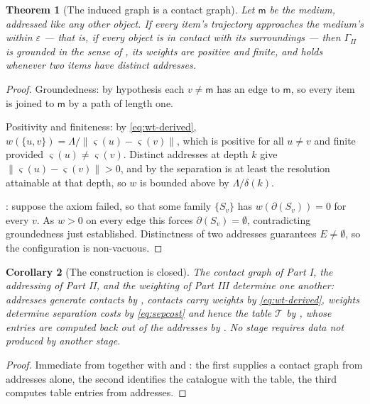 \documentclass[11pt,twocolumn,a4paper]{article}
\theoremstyle{thmstyle}
\newtheorem{theorem}{Theorem}[section]
\newtheorem{corollary}[theorem]{Corollary}
\theoremstyle{definition}
\theoremstyle{remark}
\newcommand{\Gph}{\Gamma}
\newcommand{\E}{E}
\newcommand{\wt}{w}
\newcommand{\med}{\mathsf{m}}
\newcommand{\cut}{\partial}
\newcommand{\Proc}{\Pi}
\newcommand{\Tab}{\mathcal{T}}
\newcommand{\sse}{\varsigma}
\newcommand{\norm}[1]{\lVert#1\rVert}
\newcommand{\eps}{\varepsilon}
\begin{document}
\begin{theorem}[The induced graph is a contact graph]
\label{thm:induced-grounded}
Let $\med$ be the medium, addressed like any other object. If every
item's trajectory approaches the medium's within $\eps$ --- that is, if
every object is in contact with its surroundings --- then
$\Gph_\Proc$ is grounded in the sense of , its weights
are positive and finite, and  holds whenever
two items have distinct addresses.
\end{theorem}

\begin{proof}
Groundedness: by hypothesis each $v \neq \med$ has an edge to $\med$,
so every item is joined to $\med$ by a path of length one.

Positivity and finiteness: by \eqref{eq:wt-derived},
$\wt(\{u,v\}) = \Lambda/\norm{\sse(u)-\sse(v)}$, which is positive for
all $u \neq v$ and finite provided $\sse(u) \neq \sse(v)$. Distinct
addresses at depth $k$ give $\norm{\sse(u)-\sse(v)} > 0$, and by
 the separation is at least the resolution
attainable at that depth, so $\wt$ is bounded above by
$\Lambda/\delta(k)$.

: suppose the axiom failed, so that some family
$\{S_v\}$ has $\wt(\cut(S_v)) = 0$ for every $v$. As $\wt > 0$ on every
edge this forces $\cut(S_v) = \emptyset$, contradicting groundedness
just established. Distinctness of two addresses guarantees $\E \neq
\emptyset$, so the configuration is non-vacuous.
\end{proof}

\begin{corollary}[The construction is closed]
\label{cor:closed}
The contact graph of Part I, the addressing of Part II, and the
weighting of Part III determine one another: addresses generate
contacts by , contacts carry weights by
\eqref{eq:wt-derived}, weights determine separation costs by
\eqref{eq:sepcost} and hence the table $\Tab$ by ,
whose entries are computed back out of the addresses by
. No stage requires data not produced by
another stage.
\end{corollary}

\begin{proof}
Immediate from  together with
 and : the first
supplies a contact graph from addresses alone, the second identifies
the catalogue with the table, the third computes table entries from
addresses.
\end{proof}
\end{document}
